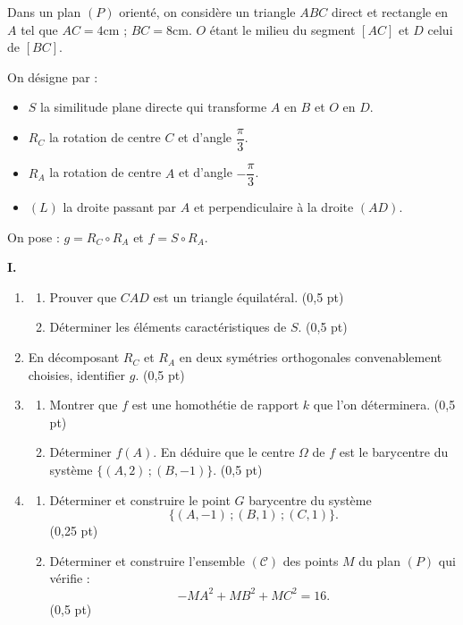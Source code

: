 

Dans un plan $(P)$ orienté, on considère un triangle $ABC$ direct et rectangle en $A$ tel que $AC = 4\text{cm}$ ; $BC = 8\text{cm}$. $O$ étant le milieu du segment $[AC]$ et $D$ celui de $[BC]$.

On désigne par :
\begin{itemize}[label=\textbullet]
	\item $S$ la similitude plane directe qui transforme $A$ en $B$ et $O$ en $D$.
	\item $R_C$ la rotation de centre $C$ et d'angle $\dfrac{\pi}{3}$.
	\item $R_A$ la rotation de centre $A$ et d'angle $-\dfrac{\pi}{3}$.
	\item $(L)$ la droite passant par $A$ et perpendiculaire à la droite $(AD)$.
\end{itemize}

On pose : $g = R_C \circ R_A$ et $f = S \circ R_A$.

\medskip
\noindent\textbf{I.}

\begin{enumerate}
	\item
	\begin{enumerate}
		\item Prouver que $CAD$ est un triangle équilatéral. \hfill (0,5 pt)
		\item Déterminer les éléments caractéristiques de $S$. \hfill (0,5 pt)
	\end{enumerate}
	\item En décomposant $R_C$ et $R_A$ en deux symétries orthogonales convenablement choisies, identifier $g$. \hfill (0,5 pt)
	\item
	\begin{enumerate}
		\item Montrer que $f$ est une homothétie de rapport $k$ que l'on déterminera. \hfill (0,5 pt)
		\item Déterminer $f(A)$. En déduire que le centre $\Omega$ de $f$ est le barycentre du système $\{(A,2)\,;(B,-1)\}$. \hfill (0,5 pt)
	\end{enumerate}
	\item
	\begin{enumerate}
		\item Déterminer et construire le point $G$ barycentre du système
		$$
		\{(A,-1)\,;(B,1)\,;(C,1)\}.
		$$
		\hfill (0,25 pt)
		\item Déterminer et construire l'ensemble $(\mathscr{C})$ des points $M$ du plan $(P)$ qui vérifie :
		$$
		-MA^2 + MB^2 + MC^2 = 16.
		$$
		\hfill (0,5 pt)
	\end{enumerate}
\end{enumerate}


